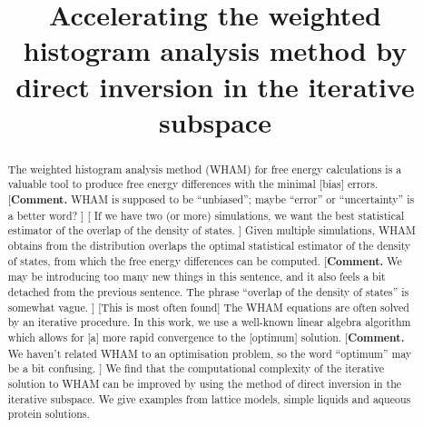 \documentclass{gMOS2e}
\begin{document}
\newcommand{\vct}[1]{\mathbf{#1}}
\newcommand{\vx}{\vct{x}}
\newcommand{\vy}{\vct{y}}
\newcommand{\Z}{\mathcal{Z}}
\newcommand{\E}{\mathcal{E}}
\newcommand{\Ham}{\mathcal{H}}
\newcommand{\W}{\mathcal{W}}
\newcommand{\A}{\mathcal{A}}

\newcommand{\repl}[2]{{\color{gray} [#1] }{\color{blue} #2}}
\newcommand{\add}[1]{{\color{blue} #1}}
\newcommand{\del}[1]{{\color{gray} [#1]}}
\newcommand{\note}[1]{{\color{OliveGreen}\small [\textbf{Comment.} #1]}}



\title{Accelerating the weighted histogram analysis method
by direct inversion in the iterative subspace}


\author{
}

\maketitle




\begin{abstract}
The weighted histogram analysis method (WHAM)
for free energy calculations
is a valuable tool to produce
free energy differences with the minimal \repl{bias}{errors}.
\note{
WHAM is supposed to be ``unbiased'';
maybe ``error'' or ``uncertainty'' is a better word?
}
%
\repl{
If we have two (or more) simulations,
we want the best statistical estimator
of the overlap of the density of states.
}
{
Given multiple simulations,
WHAM obtains
from the distribution overlaps
the optimal statistical estimator
of the density of states,
from which the free energy differences
can be computed.
}
%
\note{
We may be introducing too many new things in this sentence,
and it also feels a bit detached from the previous sentence.
The phrase ``overlap of the density of states'' is somewhat vague.
}
%
\repl{This is most often found}{The WHAM equations are often solved}
by an iterative procedure.
%
In this work,
we use a well-known linear algebra algorithm
which allows for
\repl{a}{more}
rapid convergence to the \repl{optimum}{solution}.
%
\note{
We haven't related WHAM to an optimisation problem,
so the word ``optimum'' may be a bit confusing.
}
%
We find \add{that} the computational complexity of
the iterative solution to WHAM
can be improved by using the method of
direct inversion in the iterative subspace.
%
We give examples from
\add{lattice models,}
simple liquids
and aqueous protein solutions.
\end{abstract}
\end{document}
